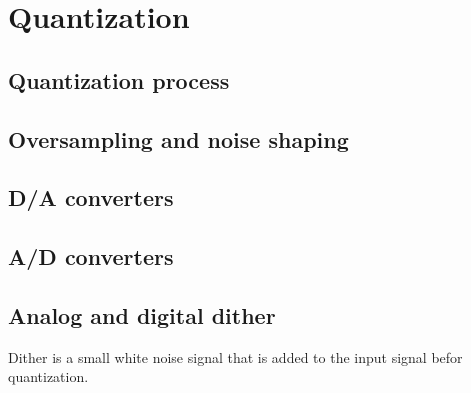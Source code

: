 \section{Quantization}
\subsection{Quantization process}
\subsection{Oversampling and noise shaping}
\subsection{D/A converters}
\subsection{A/D converters}
\subsection{Analog and digital dither}
Dither is a small white noise signal that is added to the input signal befor quantization.